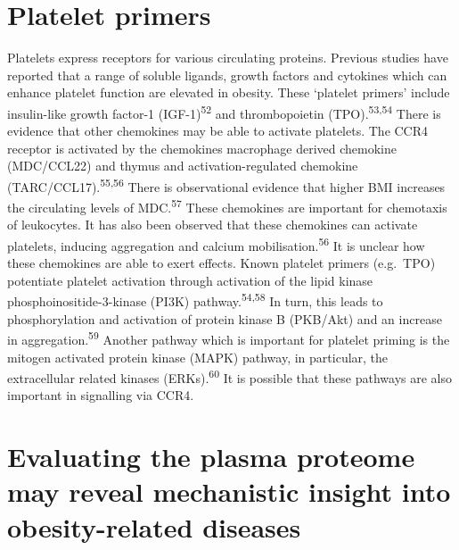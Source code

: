\documentclass[11pt,twoside]{bristolthesis}
\begin{document}
\hypertarget{platelet-primers}{%
\section{Platelet primers}\label{platelet-primers}}

Platelets express receptors for various circulating proteins. Previous studies have reported that a range of soluble ligands, growth factors and cytokines which can enhance platelet function are elevated in obesity. These `platelet primers' include insulin-like growth factor-1 (IGF-1)\textsuperscript{52} and thrombopoietin (TPO).\textsuperscript{53,54} There is evidence that other chemokines may be able to activate platelets. The CCR4 receptor is activated by the chemokines macrophage derived chemokine (MDC/CCL22) and thymus and activation-regulated chemokine (TARC/CCL17).\textsuperscript{55,56} There is observational evidence that higher BMI increases the circulating levels of MDC.\textsuperscript{57} These chemokines are important for chemotaxis of leukocytes. It has also been observed that these chemokines can activate platelets, inducing aggregation and calcium mobilisation.\textsuperscript{56} It is unclear how these chemokines are able to exert effects. Known platelet primers (e.g.~TPO) potentiate platelet activation through activation of the lipid kinase phosphoinositide-3-kinase (PI3K) pathway.\textsuperscript{54,58} In turn, this leads to phosphorylation and activation of protein kinase B (PKB/Akt) and an increase in aggregation.\textsuperscript{59} Another pathway which is important for platelet priming is the mitogen activated protein kinase (MAPK) pathway, in particular, the extracellular related kinases (ERKs).\textsuperscript{60} It is possible that these pathways are also important in signalling via CCR4.

\hypertarget{evaluating-the-plasma-proteome-may-reveal-mechanistic-insight-into-obesity-related-diseases}{%
\section{Evaluating the plasma proteome may reveal mechanistic insight into obesity-related diseases}\label{evaluating-the-plasma-proteome-may-reveal-mechanistic-insight-into-obesity-related-diseases}}
\end{document}
